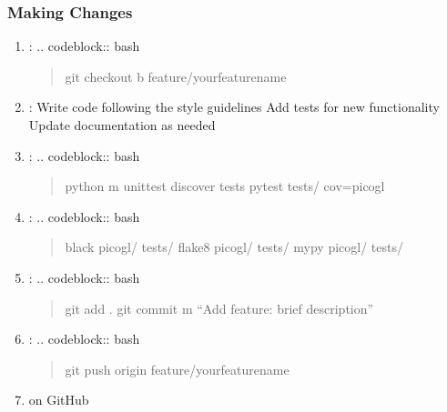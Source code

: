\documentclass[a4paper,10pt,english,openany,oneside]{sphinxmanual}
\begin{document}
\subsubsection{Making Changes}
\label{\detokenize{contributing:making-changes}}\begin{enumerate}
%
\item {} 
\sphinxAtStartPar
{}:
.. code\sphinxhyphen{}block:: bash
\begin{quote}

\sphinxAtStartPar
git checkout \sphinxhyphen{}b feature/your\sphinxhyphen{}feature\sphinxhyphen{}name
\end{quote}

\item {} 
\sphinxAtStartPar
{}:
\sphinxhyphen{} Write code following the style guidelines
\sphinxhyphen{} Add tests for new functionality
\sphinxhyphen{} Update documentation as needed

\item {} 
\sphinxAtStartPar
{}:
.. code\sphinxhyphen{}block:: bash
\begin{quote}

\sphinxAtStartPar
python \sphinxhyphen{}m unittest discover tests
pytest tests/ \textendash{}cov=picogl
\end{quote}

\item {} 
\sphinxAtStartPar
{}:
.. code\sphinxhyphen{}block:: bash
\begin{quote}

\sphinxAtStartPar
black picogl/ tests/
flake8 picogl/ tests/
mypy picogl/ tests/
\end{quote}

\item {} 
\sphinxAtStartPar
{}:
.. code\sphinxhyphen{}block:: bash
\begin{quote}

\sphinxAtStartPar
git add .
git commit \sphinxhyphen{}m “Add feature: brief description”
\end{quote}

\item {} 
\sphinxAtStartPar
{}:
.. code\sphinxhyphen{}block:: bash
\begin{quote}

\sphinxAtStartPar
git push origin feature/your\sphinxhyphen{}feature\sphinxhyphen{}name
\end{quote}

\item {} 
\sphinxAtStartPar
{} on GitHub

\end{enumerate}
\end{document}
